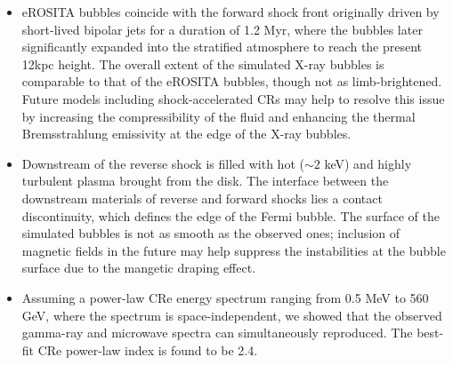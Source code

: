 \begin{itemize}
\item eROSITA bubbles coincide with the forward shock front
      originally driven by short-lived bipolar jets
      for a duration of 1.2 Myr, where the bubbles later significantly
      expanded into the stratified atmosphere to reach the present 12kpc height.
      The overall extent of the simulated X-ray bubbles is comparable to
      that of the eROSITA bubbles, though not as limb-brightened.
      Future models including shock-accelerated CRs may help to resolve this issue by
      increasing the compressibility of the fluid and
      enhancing the thermal Bremsstrahlung emissivity
      at the edge of the X-ray bubbles.
\item Downstream of the reverse shock is filled with hot ($\sim2$ keV) and highly turbulent
      plasma brought from the disk. The interface between the downstream materials of reverse and
      forward shocks lies a contact discontinuity, which defines the edge of the Fermi bubble.
      The surface of the simulated bubbles is
      not as smooth as the observed ones; inclusion of magnetic fields in the future may help suppress
      the instabilities at the bubble surface due to the mangetic draping effect.
\item Assuming a power-law CRe energy spectrum ranging from 0.5 MeV to 560 GeV,
      where the spectrum is space-independent,
      we showed that the observed gamma-ray and microwave spectra
      can simultaneously reproduced. The best-fit CRe power-law index is found to be 2.4.

\end{itemize}
